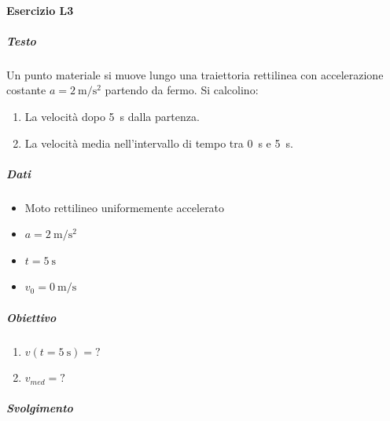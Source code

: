 \documentclass{article}
\begin{document}
\paragraph*{Esercizio L3}
\subparagraph*{Testo}
Un punto materiale si muove lungo una traiettoria rettilinea con accelerazione costante \( a = \SI{2}{\meter\per\second\squared} \) partendo da fermo. Si calcolino:
\begin{enumerate}
    \item[(a)] La velocità dopo \SI{5}{\second} dalla partenza.
    \item[(b)] La velocità media nell'intervallo di tempo tra \SI{0}{\second} e \SI{5}{\second}.
\end{enumerate}
\subparagraph*{Dati}
\begin{itemize}
    \item Moto rettilineo uniformemente accelerato
    \item $a = \SI{2}{\meter\per\second\squared}$
    \item $t = \SI{5}{\second}$
    \item $v_0 = \SI{0}{\meter\per\second}$
\end{itemize}
\subparagraph*{Obiettivo}
\begin{enumerate}
    \item[(a)] $v(t = \SI{5}{\second}) = ?$
    \item[(b)] $v_{med} = ?$
\end{enumerate}
\subparagraph*{Svolgimento}
\end{document}
